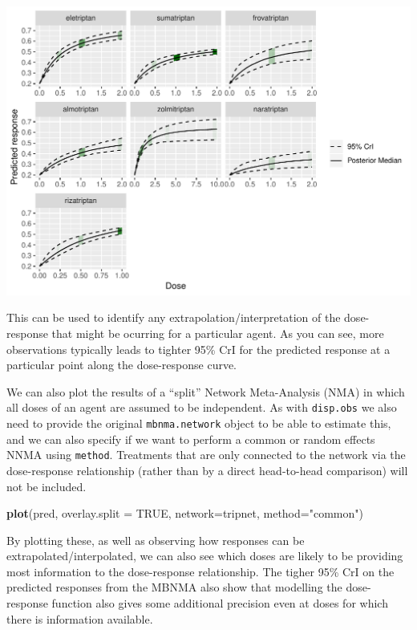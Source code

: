 \documentclass[]{article}
\newenvironment{Shaded}{\begin{snugshade}}{\end{snugshade}}
\newcommand{\DataTypeTok}[1]{\textcolor[rgb]{0.13,0.29,0.53}{#1}}
\newcommand{\KeywordTok}[1]{\textcolor[rgb]{0.13,0.29,0.53}{\textbf{#1}}}
\newcommand{\NormalTok}[1]{#1}
\newcommand{\OtherTok}[1]{\textcolor[rgb]{0.56,0.35,0.01}{#1}}
\newcommand{\StringTok}[1]{\textcolor[rgb]{0.31,0.60,0.02}{#1}}
\begin{document}
\includegraphics{mbnmadose_files/figure-latex/unnamed-chunk-44-1.pdf}

This can be used to identify any extrapolation/interpretation of the
dose-response that might be ocurring for a particular agent. As you can
see, more observations typically leads to tighter 95\% CrI for the
predicted response at a particular point along the dose-response curve.

We can also plot the results of a ``split'' Network Meta-Analysis (NMA)
in which all doses of an agent are assumed to be independent. As with
\texttt{disp.obs} we also need to provide the original
\texttt{mbnma.network} object to be able to estimate this, and we can
also specify if we want to perform a common or random effects NNMA using
\texttt{method}. Treatments that are only connected to the network via
the dose-response relationship (rather than by a direct head-to-head
comparison) will not be included.

\begin{Shaded}
\begin{Highlighting}[]
\KeywordTok{plot}\NormalTok{(pred, }\DataTypeTok{overlay.split =} \OtherTok{TRUE}\NormalTok{, }\DataTypeTok{network=}\NormalTok{tripnet, }\DataTypeTok{method=}\StringTok{"common"}\NormalTok{)}
\end{Highlighting}
\end{Shaded}

By plotting these, as well as observing how responses can be
extrapolated/interpolated, we can also see which doses are likely to be
providing most information to the dose-response relationship. The tigher
95\% CrI on the predicted responses from the MBNMA also show that
modelling the dose-response function also gives some additional
precision even at doses for which there is information available.
\end{document}
